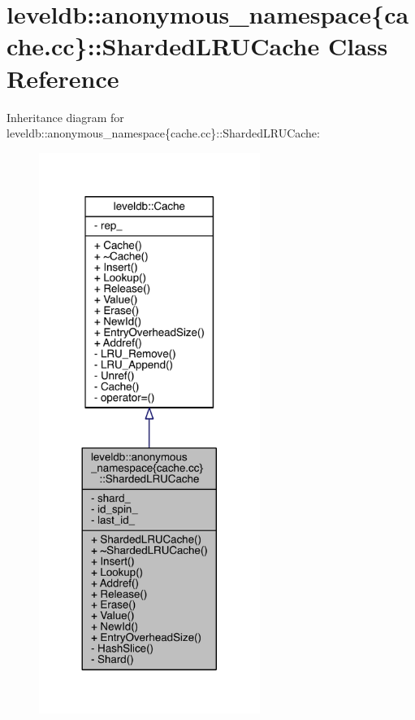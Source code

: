 \hypertarget{classleveldb_1_1anonymous__namespace_02cache_8cc_03_1_1_sharded_l_r_u_cache}{}\section{leveldb\+:\+:anonymous\+\_\+namespace\{cache.\+cc\}\+:\+:Sharded\+L\+R\+U\+Cache Class Reference}
\label{classleveldb_1_1anonymous__namespace_02cache_8cc_03_1_1_sharded_l_r_u_cache}


Inheritance diagram for leveldb\+:\+:anonymous\+\_\+namespace\{cache.\+cc\}\+:\+:Sharded\+L\+R\+U\+Cache\+:
\nopagebreak
\begin{figure}[H]
\begin{center}
\leavevmode
\includegraphics[width=204pt]{classleveldb_1_1anonymous__namespace_02cache_8cc_03_1_1_sharded_l_r_u_cache__inherit__graph}
\end{center}
\end{figure}


